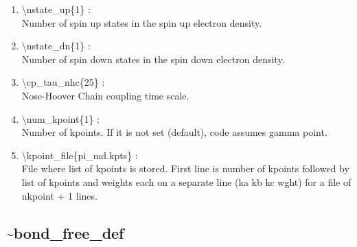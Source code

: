 \documentclass[12pt,titlepage]{article}
\begin{document}
\begin{enumerate}

 \vspace{0.15in} 
 \item  \textbackslash{}nstate\_up\{1\} : \\ 
     Number of spin up states in the spin up electron density.

 \vspace{0.15in} 
 \item  \textbackslash{}nstate\_dn\{1\} : \\
     Number of spin down states in the spin down electron density.

 \vspace{0.15in} 
 \item  \textbackslash{}cp\_tau\_nhc\{25\} : \\
     Nose-Hoover Chain coupling time scale.

 \vspace{0.15in} 
 \item  \textbackslash{}num\_kpoint\{1\} : \\
  Number of kpoints. If it is not set (default), code assumes gamma point.

 \vspace{0.15in} 
 \item  \textbackslash{}kpoint\_file\{pi\_md.kpts\} : \\
 File where list of kpoints is stored. First line is number of kpoints followed
by list of kpoints and weights each on a separate line (ka kb kc  wght) for a 
file of nkpoint + 1 lines.

\end{enumerate}

\newpage
\subsection*{\bf \~{}bond\_free\_def}
\end{document}
